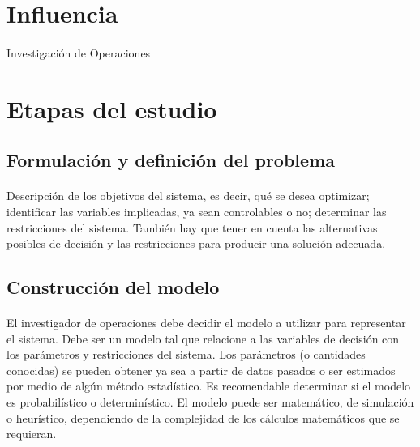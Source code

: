 \documentclass[12pt, a4paper,spanish]{article}
\begin{document}
	\section{Influencia}
		\paragraph{}
		Investigación de Operaciones

	\section{Etapas del estudio}
		\paragraph{}

		\subsection{Formulación y definición del problema}

			\paragraph{}
			Descripción de los objetivos del sistema, es decir, qué se desea optimizar; identificar las variables implicadas, ya sean controlables o no; determinar las restricciones del sistema. También hay que tener en cuenta las alternativas posibles de decisión y las restricciones para producir una solución adecuada.\cite{invdeop_IO}

		\subsection{Construcción del modelo}

			\paragraph{}
			El investigador de operaciones debe decidir el modelo a utilizar para representar el sistema. Debe ser un modelo tal que relacione a las variables de decisión con los parámetros y restricciones del sistema. Los parámetros (o cantidades conocidas) se pueden obtener ya sea a partir de datos pasados o ser estimados por medio de algún método estadístico. Es recomendable determinar si el modelo es probabilístico o determinístico. El modelo puede ser matemático, de simulación o heurístico, dependiendo de la complejidad de los cálculos matemáticos que se requieran.\cite{invdeop_IO}
\end{document}
